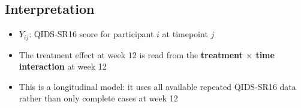 \documentclass[11pt]{article}
\begin{document}
\subsection*{Interpretation}

\begin{itemize}[leftmargin=2em]
\item $Y_{ij}$: QIDS-SR16 score for participant $i$ at timepoint $j$
\item The treatment effect at week 12 is read from the
\textbf{treatment $\times$ time interaction} at week 12
\item This is a longitudinal model: it uses all available repeated QIDS-SR16 data
rather than only complete cases at week 12
\end{itemize}
\end{document}
